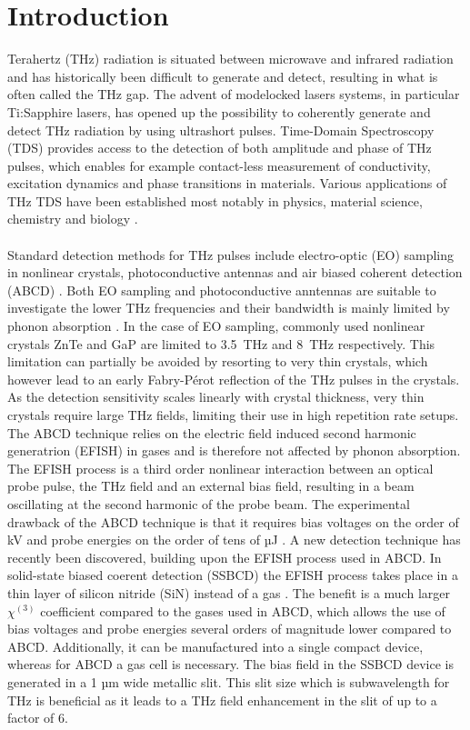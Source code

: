 \documentclass{article}
\begin{document}
\section{Introduction}
Terahertz (THz) radiation is situated between microwave and infrared radiation and has historically been difficult to generate and detect, resulting in what is often called the THz gap. The advent of modelocked lasers systems, in particular Ti:Sapphire lasers, has opened up the possibility to coherently generate and detect THz radiation by using ultrashort pulses. Time-Domain Spectroscopy (TDS) provides access to the detection of both amplitude and phase of THz pulses, which enables for example contact-less measurement of conductivity, excitation dynamics and phase transitions in materials. Various applications of THz TDS have been established most notably in physics, material science, chemistry and biology \cite{lee-2008, jepsen-2005}. 
\\~\\
Standard detection methods for THz pulses include electro-optic (EO) sampling in nonlinear crystals, photoconductive antennas and air biased coherent detection (ABCD) \cite{lee-2008, jepsen-2005}. Both EO sampling and photoconductive anntennas are suitable to investigate the lower THz frequencies and their bandwidth is mainly limited by phonon absorption \cite{burford-2017, wu-1996, leitenstorfer-1999}. In the case of EO sampling, commonly used nonlinear crystals ZnTe and GaP are limited to \mbox{3.5 THz} and \mbox{8 THz} respectively. This limitation can partially be avoided by resorting to very thin crystals, which however lead to an early Fabry-Pérot reflection of the THz pulses in the crystals. As the detection sensitivity scales linearly with crystal thickness, very thin crystals require large THz fields, limiting their use in high repetition rate setups.\\
The ABCD technique relies on the electric field induced second harmonic generatrion (EFISH) in gases and is therefore not affected by phonon absorption. The EFISH process is a third order nonlinear interaction between an optical probe pulse, the THz field and an external bias field, resulting in a beam oscillating at the second harmonic of the probe beam. The experimental drawback of the ABCD technique is that it requires bias voltages on the order of kV and probe energies on the order of tens of µJ \cite{dai-2004,karpowicz-2008}. A new detection technique has recently been discovered, building upon the EFISH process used in ABCD. In solid-state biased coerent detection (SSBCD) the EFISH process takes place in a thin layer of silicon nitride (SiN) instead of a gas \cite{tomasino-2017, tomasino-2018, tomasino-2021}. The benefit is a much larger $\chi^{(3)}$ coefficient compared to the gases used in ABCD, which allows the use of bias voltages and probe energies several orders of magnitude lower compared to ABCD. Additionally, it can be manufactured into a single compact device, whereas for ABCD a gas cell is necessary. The bias field in the SSBCD device is generated in a 1 µm wide metallic slit. This slit size which is subwavelength for THz is beneficial as it leads to a THz field enhancement in the slit of up to a factor of 6.
\end{document}
